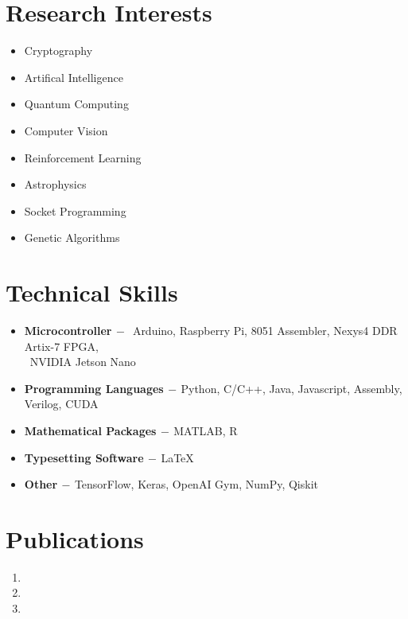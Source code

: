 \documentclass[a4paper, 12pt]{article}
\begin{document}
    \section*{Research Interests}
    \begin{multicols}{2}
    	\begin{itemize}
    		\item Cryptography
    		\item Artifical Intelligence
    		\item Quantum Computing
    		\item Computer Vision
    		\item Reinforcement Learning
    		\item Astrophysics
    		\item Socket Programming
    		\item Genetic Algorithms
    	\end{itemize}
    \end{multicols}

    \section*{Technical Skills}
	\begin{flushleft}
	    \begin{itemize}
	    	\item \textbf{Microcontroller}$\,-\,$ Arduino, Raspberry Pi, 8051 Assembler,  Nexys4 DDR Artix-7 FPGA,\\\qquad\qquad\qquad\quad\qquad\, NVIDIA Jetson Nano
	        \item \textbf{Programming Languages}$\,-\,$Python, C/C++, Java, Javascript, Assembly, Verilog, CUDA
	        \item \textbf{Mathematical Packages}$\,-\,$MATLAB, R
	        \item \textbf{Typesetting Software}$\,-\,$\LaTeX
	        \item \textbf{Other}$\,-\,$TensorFlow, Keras, OpenAI Gym, NumPy, Qiskit
	    \end{itemize}
	\end{flushleft}
	
	\section*{Publications}
  	\begin{enumerate}
  	    \item {}
  		\item {}
  		\item {}
  	\end{enumerate}
  	
\end{document}
